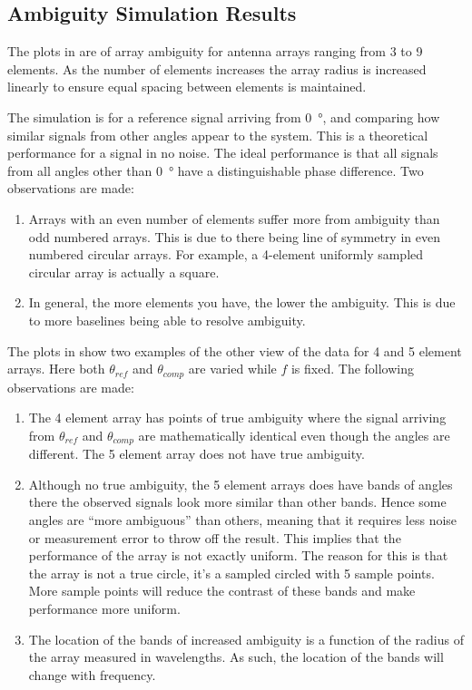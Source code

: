 \subsection{Ambiguity Simulation Results}
The plots in  are of array ambiguity for antenna arrays ranging from 3 to 9 elements. As the number of elements increases the array radius is increased linearly to ensure equal spacing between elements is maintained.

The simulation is for a reference signal arriving from \SI{0}{\degree}, and comparing how similar signals from other angles appear to the system. This is a theoretical performance for a signal in no noise. The ideal performance is that all signals from all angles other than \SI{0}{\degree} have a distinguishable phase difference. Two observations are made:
\begin{enumerate}
  \item Arrays with an even number of elements suffer more from ambiguity than odd numbered arrays. This is due to there being line of symmetry in even numbered circular arrays. For example, a 4-element uniformly sampled circular array is actually a square.
  \item In general, the more elements you have, the lower the ambiguity. This is due to more baselines being able to resolve ambiguity.
\end{enumerate}

The plots in  show two examples of the other view of the data for 4 and 5 element arrays. Here both \(\theta_{ref}\) and \(\theta_{comp}\) are varied while \(f\) is fixed. The following observations are made:
\begin{enumerate}
  \item The 4 element array has points of true ambiguity where the signal arriving from \(\theta_{ref}\) and \(\theta_{comp}\) are mathematically identical even though the angles are different. The 5 element array does not have true ambiguity.
  \item Although no true ambiguity, the 5 element arrays does have bands of angles there the observed signals look more similar than other bands. Hence some angles are ``more ambiguous'' than others, meaning that it requires less noise or measurement error to throw off the result. This implies that the performance of the array is not exactly uniform. The reason for this is that the array is not a true circle, it's a sampled circled with 5 sample points. More sample points will reduce the contrast of these bands and make performance more uniform.
  \item The location of the bands of increased ambiguity is a function of the radius of the array measured in wavelengths. As such, the location of the bands will change with frequency.
\end{enumerate}

